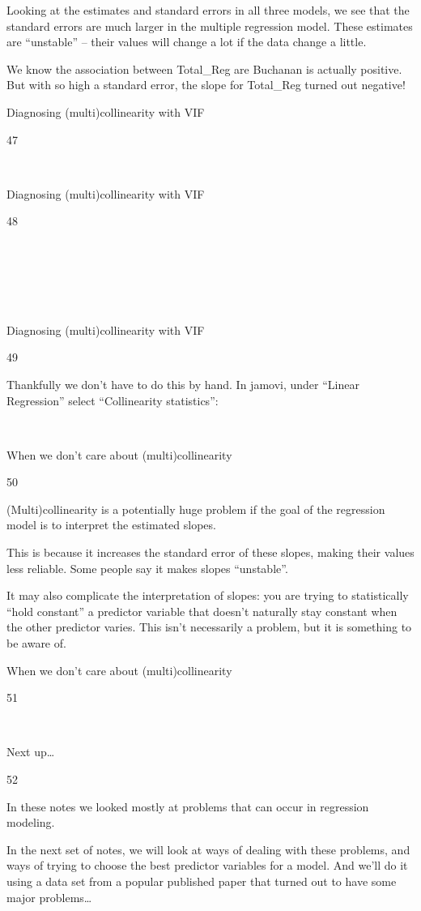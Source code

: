 \documentclass[
  letterpaper,
  DIV=11,
  numbers=noendperiod]{scrreprt}
\begin{document}
Looking at the estimates and standard errors in all three models, we see
that the standard errors are much larger in the multiple regression
model. These estimates are ``unstable'' -- their values will change a
lot if the data change a little.

We know the association between Total\_Reg are Buchanan is actually
positive. But with so high a standard error, the slope for Total\_Reg
turned out negative!

Diagnosing (multi)collinearity with VIF

47

~

Diagnosing (multi)collinearity with VIF

48

~

~

~

Diagnosing (multi)collinearity with VIF

49

Thankfully we don't have to do this by hand. In jamovi, under ``Linear
Regression'' select ``Collinearity statistics'':

~

When we don't care about (multi)collinearity

50

(Multi)collinearity is a potentially huge problem if the goal of the
regression model is to interpret the estimated slopes.

This is because it increases the standard error of these slopes, making
their values less reliable. Some people say it makes slopes
``unstable''.

It may also complicate the interpretation of slopes: you are trying to
statistically ``hold constant'' a predictor variable that doesn't
naturally stay constant when the other predictor varies. This isn't
necessarily a problem, but it is something to be aware of.

When we don't care about (multi)collinearity

51

~

Next up\ldots{}

52

In these notes we looked mostly at problems that can occur in regression
modeling.

In the next set of notes, we will look at ways of dealing with these
problems, and ways of trying to choose the best predictor variables for
a model. And we'll do it using a data set from a popular published paper
that turned out to have some major problems\ldots{}
\end{document}
